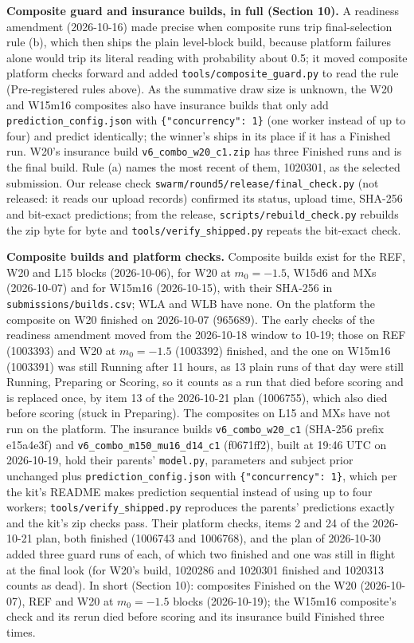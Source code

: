 \documentclass[
]{article}
\begin{document}
\textbf{Composite guard and insurance builds, in full (Section 10).} A
readiness amendment (2026-10-16) made precise when composite runs trip
final-selection rule (b), which then ships the plain level-block build,
because platform failures alone would trip its literal reading with
probability about 0.5; it moved composite platform checks forward and
added \texttt{tools/composite\_guard.py} to read the rule
(Pre-registered rules above). As the summative draw size is unknown, the
W20 and W15m16 composites also have insurance builds that only add
\texttt{prediction\_config.json} with \texttt{\{"concurrency":\ 1\}}
(one worker instead of up to four) and predict identically; the winner's
ships in its place if it has a Finished run. W20's insurance build
\texttt{v6\_combo\_w20\_c1.zip} has three Finished runs and is the final
build. Rule (a) names the most recent of them, 1020301, as the selected
submission. Our release check
\texttt{swarm/round5/release/final\_check.py} (not released: it reads
our upload records) confirmed its status, upload time, SHA-256 and
bit-exact predictions; from the release,
\texttt{scripts/rebuild\_check.py} rebuilds the zip byte for byte and
\texttt{tools/verify\_shipped.py} repeats the bit-exact check.

\textbf{Composite builds and platform checks.} Composite builds exist
for the REF, W20 and L15 blocks (2026-10-06), for W20 at \(m_0 = -1.5\),
W15d6 and MXs (2026-10-07) and for W15m16 (2026-10-15), with their
SHA-256 in \texttt{submissions/builds.csv}; WLA and WLB have none. On
the platform the composite on W20 finished on 2026-10-07 (965689). The
early checks of the readiness amendment moved from the 2026-10-18 window
to 10-19; those on REF (1003393) and W20 at \(m_0 = -1.5\) (1003392)
finished, and the one on W15m16 (1003391) was still Running after 11
hours, as 13 plain runs of that day were still Running, Preparing or
Scoring, so it counts as a run that died before scoring and is replaced
once, by item 13 of the 2026-10-21 plan (1006755), which also died
before scoring (stuck in Preparing). The composites on L15 and MXs have
not run on the platform. The insurance builds
\texttt{v6\_combo\_w20\_c1} (SHA-256 prefix e15a4e3f) and
\texttt{v6\_combo\_m150\_mu16\_d14\_c1} (f0671ff2), built at 19:46 UTC
on 2026-10-19, hold their parents' \texttt{model.py}, parameters and
subject prior unchanged plus \texttt{prediction\_config.json} with
\texttt{\{"concurrency":\ 1\}}, which per the kit's README makes
prediction sequential instead of using up to four workers;
\texttt{tools/verify\_shipped.py} reproduces the parents' predictions
exactly and the kit's zip checks pass. Their platform checks, items 2
and 24 of the 2026-10-21 plan, both finished (1006743 and 1006768), and
the plan of 2026-10-30 added three guard runs of each, of which two
finished and one was still in flight at the final look (for W20's build,
1020286 and 1020301 finished and 1020313 counts as dead). In short
(Section 10): composites Finished on the W20 (2026-10-07), REF and W20
at \(m_0 = -1.5\) blocks (2026-10-19); the W15m16 composite's check and
its rerun died before scoring and its insurance build Finished three
times.
\end{document}
